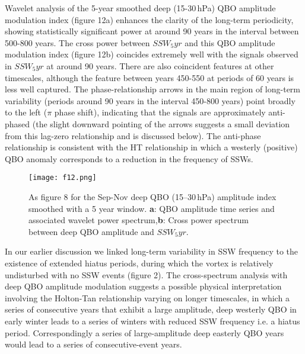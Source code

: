\documentclass[wcd, manuscript]{copernicus}
\begin{document}
Wavelet analysis of the 5-year smoothed deep (15-30\,hPa) QBO amplitude modulation index (figure 12a) enhances the clarity of the long-term periodicity, showing statistically significant power at around 90 years in the interval between 500-800 years. The cross power between $SSW_5yr$ and this QBO amplitude modulation index (figure 12b) coincides extremely well with the signals observed in $SSW_5yr$ at around 90 years. There are also coincident features at other timescales, although the feature between years 450-550 at periods of 60 years is less well captured. The phase-relationship arrows in the main region of long-term variability (periods around 90 years in the interval 450-800 years) point broadly to the left ($\pi$ phase shift), indicating that the signals are approximately anti-phased (the slight downward pointing of the arrows suggests a small deviation from this lag-zero relationship and is discussed below). The anti-phase relationship is consistent with the HT relationship in which a westerly (positive) QBO anomaly corresponds to a reduction in the frequency of SSWs.



\begin{center}
\begin{figure}[h!]
\texttt{[image: f12.png]}
\caption{As figure 8 for the Sep-Nov deep QBO (15--30\,hPa) amplitude index smoothed with a 5 year window. \textbf{a}: QBO amplitude time series and associated wavelet power spectrum,\textbf{b}: Cross power spectrum between deep QBO amplitude and $SSW_5yr$.}
\end{figure}
\end{center}

In our earlier discussion we linked long-term variability in SSW frequency to the existence of extended hiatus periods, during which the vortex is relatively undisturbed with no SSW events (figure 2). The cross-spectrum analysis with deep QBO amplitude modulation suggests a possible physical interpretation involving the Holton-Tan relationship varying on longer timescales, in which a series of consecutive years that exhibit a large amplitude, deep westerly QBO in early winter leads to a series of winters with reduced SSW frequency i.e. a hiatus period. Correspondingly a series of large-amplitude deep easterly QBO years would lead to a series of consecutive-event years.
\end{document}
